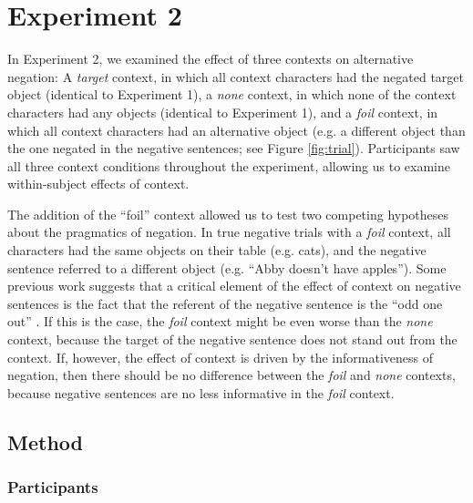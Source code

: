 \documentclass[10pt,letterpaper]{article}
\begin{document}
\section{Experiment 2}

In Experiment 2, we examined the effect of three contexts on alternative negation: A \emph{target} context, in which all context characters had the negated target object (identical to Experiment 1), a \emph{none} context, in which none of the context characters had any objects (identical to Experiment 1), and a \emph{foil} context, in which all context characters had an alternative object (e.g. a different object than the one negated in the negative sentences; see Figure \ref{fig:trial}).  Participants saw all three context conditions throughout the experiment, allowing us to examine within-subject effects of context.  

The addition of the ``foil'' context allowed us to test two competing hypotheses about the pragmatics of negation.  In true negative trials with a \emph{foil} context, all characters had the same objects on their table (e.g. cats), and the negative sentence referred to a different object (e.g. ``Abby doesn't have apples'').  Some previous work suggests that a critical element of the effect of context on negative sentences is the fact that the referent of the negative sentence is the ``odd one out'' \cite{wason1965}.  If this is the case, the \emph{foil} context might be even worse than the \emph{none} context, because the target of the negative sentence does not stand out from the context.  If, however, the effect of context is driven by the informativeness of negation, then there should be no difference between the \emph{foil} and \emph{none} contexts, because negative sentences are no less informative in the \emph{foil} context.  


\subsection{Method}

\subsubsection{Participants}
\end{document}
